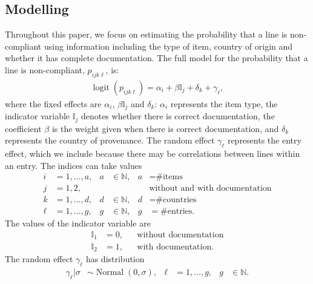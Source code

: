 \documentclass{article}
\DeclareMathOperator{\logit}{logit}
\DeclareMathOperator{\Normal}{Normal}
\begin{document}
\subsection{Modelling}\label{sec:model}
Throughout this paper, we focus on estimating the probability that a line is non-compliant using information including the type of item, country of origin and whether it has complete documentation. The full model for the probability that a line is non-compliant, \(p_{ijk\ell}\),  is: 
\begin{align}
\logit(p_{ijk\ell}) = \alpha_{i} + \beta\mathbb{I}_j + \delta_k + \gamma_\ell \label{eq:logit_model_sim},
\end{align}
where the fixed effects are $\alpha_i$, $\beta\mathbb{I}_j$ and $\delta_k$: $\alpha_i$ represents the item type, the indicator variable $\mathbb{I}_j$ denotes whether there is correct documentation, the coefficient $\beta$ is the weight given when there is correct documentation, and $\delta_k$ represents the country of provenance. The random effect $\gamma_\ell$ represents the entry effect, which we include because there may be correlations between lines within an entry. The indices can take values
\begin{align}
i &=1, \ldots, a, & a&\in \mathbb{N},& a &= \text{\# items}\\
j &= 1, 2, & & & &\text{without and with documentation}\\
k &= 1,\ldots, d,& d &\in \mathbb{N},& d &= \text{\# countries}\\
\ell &= 1,\ldots,g,& g&\in \mathbb{N},& g &= \text{\# entries}.
\end{align}
The values of the indicator variable are
\begin{align}
\mathbb{I}_1 & = 0,& &\text{without documentation}\\
\mathbb{I}_2 &= 1,& &\text{with documentation}.
\end{align}
The random effect $\gamma_\ell$ has distribution
\begin{align}
\gamma_\ell | \sigma &\sim \Normal(0, \sigma), & \ell &= 1,\ldots, g, & g&\in \mathbb{N}.
\label{eq:entry_effect}
\end{align}
\end{document}
